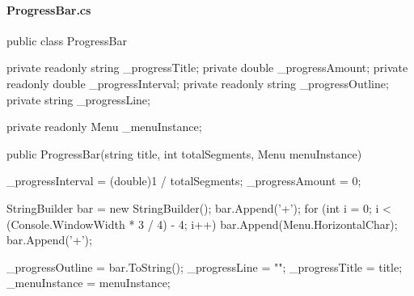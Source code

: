 \begin{flushleft}
\pagebreak
    
    \paragraph{ProgressBar.cs}
    \begin{cscode}
public class ProgressBar
{
    private readonly string _progressTitle;
    private double _progressAmount;
    private readonly double _progressInterval;
    private readonly string _progressOutline;
    private string _progressLine;

    private readonly Menu _menuInstance;

    public ProgressBar(string title, int totalSegments, Menu menuInstance)
    {
        _progressInterval = (double)1 / totalSegments;
        _progressAmount = 0;

        StringBuilder bar = new StringBuilder();
        bar.Append('+');
        for (int i = 0; i < (Console.WindowWidth * 3 / 4) - 4; i++) bar.Append(Menu.HorizontalChar);
        bar.Append('+');

        _progressOutline = bar.ToString();
        _progressLine = "";
        _progressTitle = title;
        _menuInstance = menuInstance;
    }

}
\end{cscode}
\end{flushleft}

